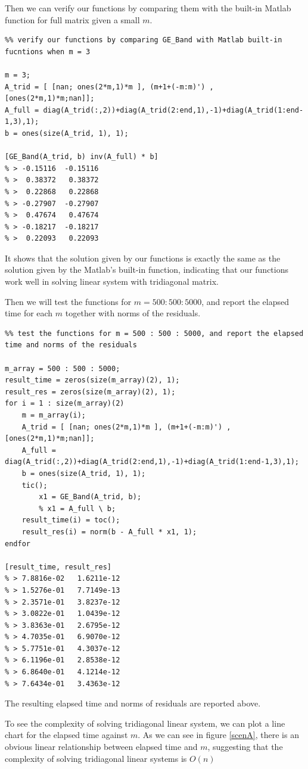 \documentclass[12pt,oneside,a4paper]{article}
\begin{document}
Then we can verify our functions by comparing them with the built-in Matlab function for full matrix given a small $m$.

\begin{lstlisting}
%% verify our functions by comparing GE_Band with Matlab built-in fucntions when m = 3

m = 3;
A_trid = [ [nan; ones(2*m,1)*m ], (m+1+(-m:m)') , [ones(2*m,1)*m;nan]];
A_full = diag(A_trid(:,2))+diag(A_trid(2:end,1),-1)+diag(A_trid(1:end-1,3),1);
b = ones(size(A_trid, 1), 1);

[GE_Band(A_trid, b) inv(A_full) * b]
% > -0.15116  -0.15116
% >  0.38372   0.38372
% >  0.22868   0.22868
% > -0.27907  -0.27907
% >  0.47674   0.47674
% > -0.18217  -0.18217
% >  0.22093   0.22093
\end{lstlisting}

It shows that the solution given by our functions is exactly the same as the solution given by the Matlab's built-in function, indicating that our functions work well in solving linear system with tridiagonal matrix.

Then we will test the functions for $m = 500 : 500 : 5000$, and report the elapsed time for each $m$ together with norms of the residuals.

\begin{lstlisting}
%% test the functions for m = 500 : 500 : 5000, and report the elapsed time and norms of the residuals

m_array = 500 : 500 : 5000;
result_time = zeros(size(m_array)(2), 1);
result_res = zeros(size(m_array)(2), 1);
for i = 1 : size(m_array)(2)
    m = m_array(i);
    A_trid = [ [nan; ones(2*m,1)*m ], (m+1+(-m:m)') , [ones(2*m,1)*m;nan]];
    A_full = diag(A_trid(:,2))+diag(A_trid(2:end,1),-1)+diag(A_trid(1:end-1,3),1);
    b = ones(size(A_trid, 1), 1);
    tic();
        x1 = GE_Band(A_trid, b);
        % x1 = A_full \ b;
    result_time(i) = toc();
    result_res(i) = norm(b - A_full * x1, 1);
endfor

[result_time, result_res]
% > 7.8816e-02   1.6211e-12
% > 1.5276e-01   7.7149e-13
% > 2.3571e-01   3.8237e-12
% > 3.0822e-01   1.0439e-12
% > 3.8363e-01   2.6795e-12
% > 4.7035e-01   6.9070e-12
% > 5.7751e-01   4.3037e-12
% > 6.1196e-01   2.8538e-12
% > 6.8640e-01   4.1214e-12
% > 7.6434e-01   3.4363e-12
\end{lstlisting}

The resulting elapsed time and norms of residuals are reported above. \clearpage

To see the complexity of solving tridiagonal linear system, we can plot a line chart for the elapsed time against $m$. As we can see in figure \ref{scenA}, there is an obvious linear relationship between elapsed time and $m$, suggesting that the complexity of solving tridiagonal linear systems is $O(n)$
\end{document}
